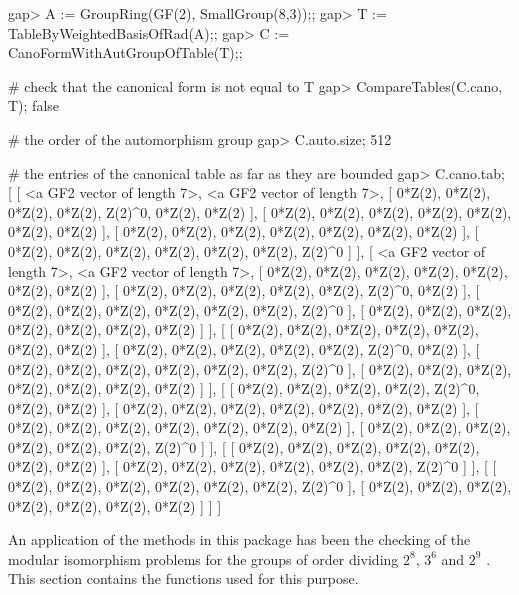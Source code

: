 \beginexample
gap> A := GroupRing(GF(2), SmallGroup(8,3));;
gap> T := TableByWeightedBasisOfRad(A);;
gap> C := CanoFormWithAutGroupOfTable(T);;

# check that the canonical form is not equal to T
gap> CompareTables(C.cano, T);
false

# the order of the automorphism group
gap> C.auto.size;
512

# the entries of the canonical table as far as they are bounded
gap> C.cano.tab;
[ [ <a GF2 vector of length 7>, <a GF2 vector of length 7>, 
      [ 0*Z(2), 0*Z(2), 0*Z(2), 0*Z(2), Z(2)^0, 0*Z(2), 0*Z(2) ], 
      [ 0*Z(2), 0*Z(2), 0*Z(2), 0*Z(2), 0*Z(2), 0*Z(2), 0*Z(2) ], 
      [ 0*Z(2), 0*Z(2), 0*Z(2), 0*Z(2), 0*Z(2), 0*Z(2), 0*Z(2) ], 
      [ 0*Z(2), 0*Z(2), 0*Z(2), 0*Z(2), 0*Z(2), 0*Z(2), Z(2)^0 ] ], 
  [ <a GF2 vector of length 7>, <a GF2 vector of length 7>, 
      [ 0*Z(2), 0*Z(2), 0*Z(2), 0*Z(2), 0*Z(2), 0*Z(2), 0*Z(2) ], 
      [ 0*Z(2), 0*Z(2), 0*Z(2), 0*Z(2), 0*Z(2), Z(2)^0, 0*Z(2) ], 
      [ 0*Z(2), 0*Z(2), 0*Z(2), 0*Z(2), 0*Z(2), 0*Z(2), Z(2)^0 ], 
      [ 0*Z(2), 0*Z(2), 0*Z(2), 0*Z(2), 0*Z(2), 0*Z(2), 0*Z(2) ] ], 
  [ [ 0*Z(2), 0*Z(2), 0*Z(2), 0*Z(2), 0*Z(2), 0*Z(2), 0*Z(2) ], 
      [ 0*Z(2), 0*Z(2), 0*Z(2), 0*Z(2), 0*Z(2), Z(2)^0, 0*Z(2) ], 
      [ 0*Z(2), 0*Z(2), 0*Z(2), 0*Z(2), 0*Z(2), 0*Z(2), Z(2)^0 ], 
      [ 0*Z(2), 0*Z(2), 0*Z(2), 0*Z(2), 0*Z(2), 0*Z(2), 0*Z(2) ] ], 
  [ [ 0*Z(2), 0*Z(2), 0*Z(2), 0*Z(2), Z(2)^0, 0*Z(2), 0*Z(2) ], 
      [ 0*Z(2), 0*Z(2), 0*Z(2), 0*Z(2), 0*Z(2), 0*Z(2), 0*Z(2) ], 
      [ 0*Z(2), 0*Z(2), 0*Z(2), 0*Z(2), 0*Z(2), 0*Z(2), 0*Z(2) ], 
      [ 0*Z(2), 0*Z(2), 0*Z(2), 0*Z(2), 0*Z(2), 0*Z(2), Z(2)^0 ] ], 
  [ [ 0*Z(2), 0*Z(2), 0*Z(2), 0*Z(2), 0*Z(2), 0*Z(2), 0*Z(2) ], 
      [ 0*Z(2), 0*Z(2), 0*Z(2), 0*Z(2), 0*Z(2), 0*Z(2), Z(2)^0 ] ], 
  [ [ 0*Z(2), 0*Z(2), 0*Z(2), 0*Z(2), 0*Z(2), 0*Z(2), Z(2)^0 ], 
      [ 0*Z(2), 0*Z(2), 0*Z(2), 0*Z(2), 0*Z(2), 0*Z(2), 0*Z(2) ] ] ]
\endexample


An application of the methods in this package has been the checking
of the modular isomorphism problems for the groups of order dividing
$2^8$, $3^6$ and $2^9$ \cite{Eic07,EKo10}. This section contains the 
functions used for this purpose. 


